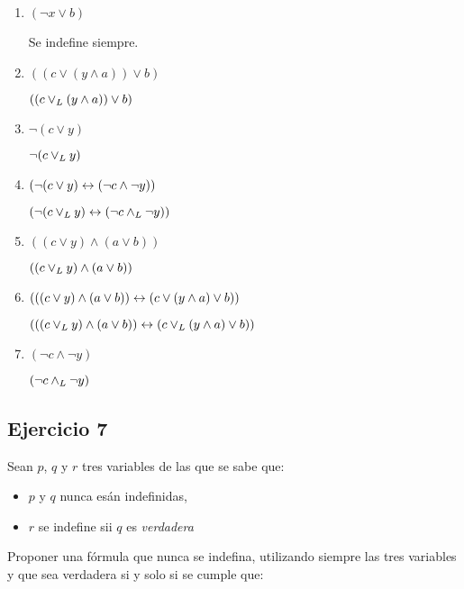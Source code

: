 \begin{enumerate}[label=\alph*)]
      \item $(\neg x \lor b)$

            Se indefine siempre.

      \item $((c \lor (y \land a)) \lor b)$

            $((c \lor _L (y \land a)) \lor b)$

      \item $\neg (c \lor y)$

            $\neg (c \lor _L y)$

      \item $(\neg (c \lor y) \leftrightarrow (\neg c \land \neg y))$

            $(\neg (c \lor _L y) \leftrightarrow (\neg c \land _L \neg y))$

      \item $((c \lor y) \land (a \lor b))$

            $((c \lor _L y) \land (a \lor b))$

      \item $(((c \lor y) \land (a \lor b)) \leftrightarrow (c \lor (y \land a) \lor b))$

            $(((c \lor _L y) \land (a \lor b)) \leftrightarrow (c \lor _L (y \land a) \lor b))$

      \item $(\neg c \land \neg y)$

            $(\neg c \land _L \neg y)$
\end{enumerate}

\subsection{Ejercicio 7}
Sean $p$, $q$ y $r$ tres variables de las que se sabe que:

\begin{itemize}
      \item $p$ y $q$ nunca esán indefinidas,
      \item $r$ se indefine sii $q$ es \textit{verdadera}
\end{itemize}

Proponer una fórmula que nunca se indefina, utilizando siempre las tres variables y que sea verdadera si y solo si se cumple que:

